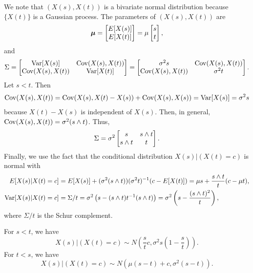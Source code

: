 \documentclass{homework}
\begin{document}
	
	We note that $(X(s), X(t))$ is a bivariate normal distribution because $\{X(t)\}$ is a Gaussian process. The parameters of $(X(s), X(t))$ are
	\begin{equation*}
		\boldsymbol{\mu} = \left[\begin{matrix}E[X(s)] \\ E[X(t)]\end{matrix}\right] = \mu\left[\begin{matrix}s\\t\end{matrix}\right],
	\end{equation*}
	and
	\begin{equation*}
		\Sigma = \left[\begin{matrix}\mathrm{Var}[X(s)] & \mathrm{Cov}(X(s), X(t)) \\ \mathrm{Cov}(X(s), X(t)) & \mathrm{Var}[X(t)]\end{matrix}\right] = \left[\begin{matrix}\sigma^2s & \mathrm{Cov}(X(s), X(t)) \\ \mathrm{Cov}(X(s), X(t)) & \sigma^2t\end{matrix}\right].
	\end{equation*}
	Let $s < t$. Then
	\begin{equation*}
		\mathrm{Cov}(X(s), X(t)) = \mathrm{Cov}(X(s), X(t)-X(s)) + \mathrm{Cov}(X(s), X(s)) = \mathrm{Var}[X(s)] = \sigma^2 s
	\end{equation*}
	because $X(t)-X(s)$ is independent of $X(s)$. Then, in general, $\mathrm{Cov}(X(s), X(t)) = \sigma^2 (s\wedge t)$. Thus,
	\begin{equation*}
		\Sigma = \sigma^2\left[\begin{matrix}s & s\wedge t \\ s\wedge t & t\end{matrix}\right].
	\end{equation*}
	Finally, we use the fact that the conditional distribution $X(s)|(X(t)=c)$ is normal with
	\begin{align*}
		E[X(s)|X(t)=c] &= E[X(s)]+(\sigma^2(s\wedge t)) (\sigma^2t)^{-1}(c - E[X(t)]) = \mu s + \frac{s\wedge t}{t}(c-\mu t),\\ \mathrm{Var}[X(s)|X(t)=c] &= \Sigma / t = \sigma^2\left(s - (s\wedge t)t^{-1}(s\wedge t)\right) = \sigma^2\left(s - \frac{(s\wedge t)^2}{t}\right),
	\end{align*}
	where $\Sigma/t$ is the Schur complement.
	
	\begin{alphaparts}
		\questionpart For $s <t$, we have
		\begin{equation*}
			X(s) | (X(t)=c) \sim N\left(\frac{s}{t}c, \sigma^2s\left(1-\frac{s}{t}\right)\right).
		\end{equation*}
		\questionpart For $t < s$, we have
		\begin{equation*}
			X(s) | (X(t) = c) \sim N\left(\mu(s-t) + c, \sigma^2(s-t)\right).
		\end{equation*}
	\end{alphaparts}
	
\end{document}
